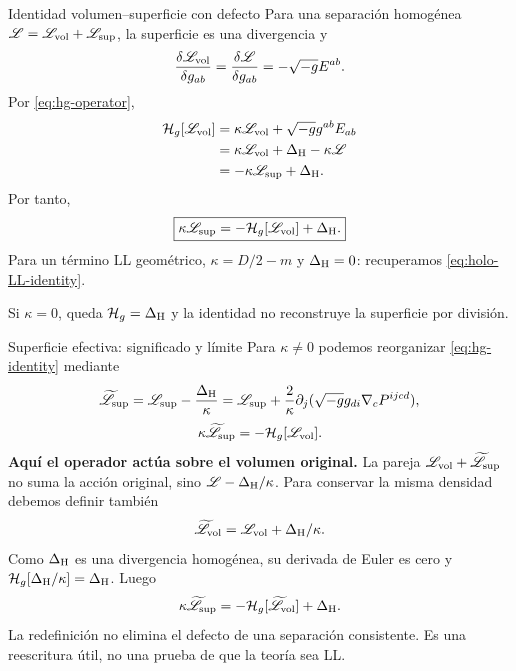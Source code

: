 \begin{frame}[label=holo-gen-05]{Identidad volumen--superficie con defecto}
Para una separación homogénea $\mathscr L=\mathscr L_{\rm vol}+\mathscr L_{\rm sup}$, la superficie es una divergencia y
\[
\frac{\delta\mathscr L_{\rm vol}}{\delta g_{ab}}
=\frac{\delta\mathscr L}{\delta g_{ab}}=-\sqrt{-g}E^{ab}.
\]
Por \eqref{eq:hg-operator},
\begin{align*}
\mathcal H_g[\mathscr L_{\rm vol}]
&=\kappa\mathscr L_{\rm vol}+\sqrt{-g}g^{ab}E_{ab}\\
&=\kappa\mathscr L_{\rm vol}+\Delta_{\rm H}-\kappa\mathscr L\\
&=-\kappa\mathscr L_{\rm sup}+\Delta_{\rm H}.
\end{align*}
Por tanto,
\begin{equation}
\boxed{\kappa\mathscr L_{\rm sup}=-\mathcal H_g[\mathscr L_{\rm vol}]+\Delta_{\rm H}.}
\label{eq:hg-identity}
\end{equation}
Para un término LL geométrico, $\kappa=D/2-m$ y $\Delta_{\rm H}=0$: recuperamos \eqref{eq:holo-LL-identity}.

Si $\kappa=0$, queda $\mathcal H_g=\Delta_{\rm H}$ y la identidad no reconstruye la superficie por división.
\end{frame}
\begin{frame}[label=holo-gen-06]{Superficie efectiva: significado y límite}
Para $\kappa\ne0$ podemos reorganizar \eqref{eq:hg-identity} mediante
\begin{equation}
\widetilde{\mathscr L}_{\rm sup}
=\mathscr L_{\rm sup}-\frac{\Delta_{\rm H}}{\kappa}
=\mathscr L_{\rm sup}+\frac2\kappa\partial_j(\sqrt{-g}g_{di}\nabla_cP^{ijcd}),
\label{eq:hg-effective}
\end{equation}
\[
\kappa\widetilde{\mathscr L}_{\rm sup}=-\mathcal H_g[\mathscr L_{\rm vol}].
\]
\textbf{Aquí el operador actúa sobre el volumen original.} La pareja
$\mathscr L_{\rm vol}+\widetilde{\mathscr L}_{\rm sup}$ no suma la acción original, sino $\mathscr L-\Delta_{\rm H}/\kappa$.
Para conservar la misma densidad debemos definir también
\[
\widetilde{\mathscr L}_{\rm vol}=\mathscr L_{\rm vol}+\Delta_{\rm H}/\kappa.
\]
Como $\Delta_{\rm H}$ es una divergencia homogénea, su derivada de Euler es cero y $\mathcal H_g[\Delta_{\rm H}/\kappa]=\Delta_{\rm H}$. Luego
\[
\kappa\widetilde{\mathscr L}_{\rm sup}
=-\mathcal H_g[\widetilde{\mathscr L}_{\rm vol}]+\Delta_{\rm H}.
\]
La redefinición no elimina el defecto de una separación consistente. Es una reescritura útil, no una prueba de que la teoría sea LL.
\end{frame}

